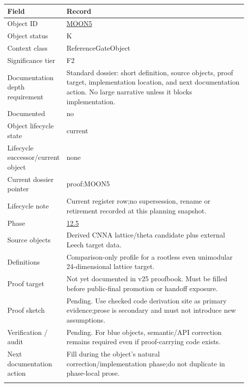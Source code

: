 \begin{longtable}{L{0.16\linewidth} L{0.81\linewidth}}
\hline
\textbf{Field} & \textbf{Record}\\
\hline
Object ID & \hyperlink{object-row-MOON5}{MOON5}\\
\hline\addlinespace[0.20em]
Object status & K\\
\hline\addlinespace[0.20em]
Context class & ReferenceGateObject\\
\hline\addlinespace[0.20em]
Significance tier & F2\\
\hline\addlinespace[0.20em]
Documentation depth requirement & Standard dossier: short definition, source objects, proof target, implementation location, and next documentation action. No large narrative unless it blocks implementation.\\
\hline\addlinespace[0.20em]
Documented & no\\
\hline\addlinespace[0.20em]
Object lifecycle state & current\\
\hline\addlinespace[0.20em]
Lifecycle successor/\allowbreak{}current object & none\\
\hline\addlinespace[0.20em]
Current dossier pointer & proof:MOON5\\
\hline\addlinespace[0.20em]
Lifecycle note & Current register row;\newline no supersession, rename or retirement recorded at this planning snapshot.\\
\hline\addlinespace[0.20em]
Phase & \hyperlink{phase-row-12-5}{12.5}\\
\hline\addlinespace[0.20em]
Source objects & Derived CNNA lattice/\allowbreak{}theta candidate plus external Leech target data.\\
\hline\addlinespace[0.20em]
Definitions & Comparison-only profile for a rootless even unimodular 24-dimensional lattice target.\\
\hline\addlinespace[0.20em]
Proof target & Not yet documented in v25 proofbook. Must be filled before public-final promotion or handoff exposure.\\
\hline\addlinespace[0.20em]
Proof sketch & Pending. Use checked code derivation site as primary evidence;\newline prose is secondary and must not introduce new assumptions.\\
\hline\addlinespace[0.20em]
Verification /\allowbreak{} audit & Pending. For blue objects, semantic/\allowbreak{}API correction remains required even if proof-carrying code exists.\\
\hline\addlinespace[0.20em]
Next documentation action & Fill during the object's natural correction/\allowbreak{}implementation phase;\newline do not duplicate in phase-local prose.\\
\hline\addlinespace[0.20em]
\end{longtable}

